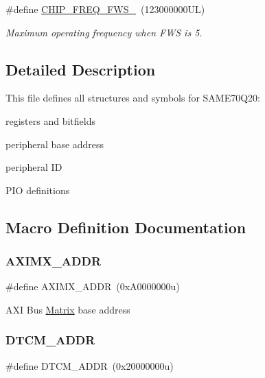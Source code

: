 \begin{DoxyCompactItemize}
\mbox{\label{group__SAME70Q20__definitions_ga3b66824f858591135877b369f98d48a5}} 
\#define \mbox{\hyperlink{group__SAME70Q20__definitions_ga3b66824f858591135877b369f98d48a5}{C\+H\+I\+P\+\_\+\+F\+R\+E\+Q\+\_\+\+F\+W\+S\+\_}}~(123000000\+U\+L)
\begin{DoxyCompactList}\small\item\em Maximum operating frequency when F\+WS is 5. \end{DoxyCompactList}\end{DoxyCompactItemize}


\subsection{Detailed Description}
This file defines all structures and symbols for S\+A\+M\+E70\+Q20\+:
\begin{DoxyItemize}
\item registers and bitfields
\item peripheral base address
\item peripheral ID
\item P\+IO definitions 
\end{DoxyItemize}

\subsection{Macro Definition Documentation}
\mbox{\label{group__SAME70Q20__definitions_ga2fb7cc681bf5e7fbce5e3635b72a330a}} 
\subsubsection{\texorpdfstring{AXIMX\_ADDR}{AXIMX\_ADDR}}
{\footnotesize\ttfamily \#define A\+X\+I\+M\+X\+\_\+\+A\+D\+DR~(0x\+A0000000u)}

A\+XI Bus \mbox{\hyperlink{structMatrix}{Matrix}} base address \mbox{\label{group__SAME70Q20__definitions_ga26626a425f7ebb3a0c2dbc276f0d9f78}} 
\subsubsection{\texorpdfstring{DTCM\_ADDR}{DTCM\_ADDR}}
{\footnotesize\ttfamily \#define D\+T\+C\+M\+\_\+\+A\+D\+DR~(0x20000000u)}

